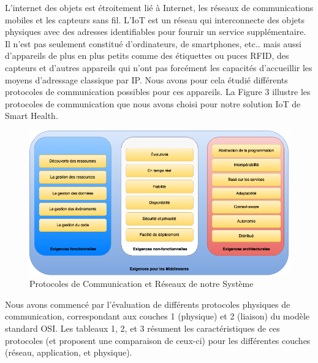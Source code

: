 \documentclass{article}
\begin{document}
L’internet des objets est étroitement lié à Internet, les réseaux de communications mobiles et les capteurs sans fil. L’IoT est un réseau qui interconnecte des objets physiques avec des adresses identifiables pour fournir un service supplémentaire. Il n’est pas seulement constitué d’ordinateurs, de smartphones, etc.. mais aussi d'appareils de plus en plus petits comme des étiquettes ou puces RFID, des capteurs et d’autres appareils qui n’ont pas forcément les capacités d’accueillir les moyens d’adressage classique par IP. Nous avons pour cela étudié différents protocoles de communication possibles pour ces appareils. La Figure 3 illustre les protocoles de communication que nous avons choisi pour notre solution IoT de Smart Health.
\\
\begin{figure}[h!]
	\hspace*{-1cm}
	\centering
	\includegraphics[width=1.14\textwidth]{Figure3.png}
	\caption{Protocoles de Communication et Réseaux de notre Système}
	\label{fig:balance}
\end{figure}

Nous avons commencé par l’évaluation de différents protocoles physiques de communication, correspondant aux couches 1 (physique) et 2 (liaison) du modèle standard OSI. Les tableaux 1, 2, et 3 \cite{Physique} \cite{catarinucci2015iot} résument les caractéristiques de ces protocoles (et proposent une comparaison de ceux-ci) pour les différentes couches (réseau, application, et physique).
\end{document}
